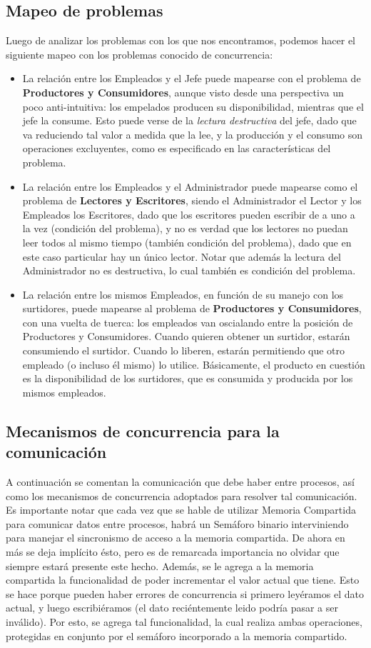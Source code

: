 \documentclass[a4paper,12pt]{article}
\begin{document}
\subsection{Mapeo de problemas}
Luego de analizar los problemas con los que nos encontramos, podemos hacer el siguiente mapeo con los problemas conocido de concurrencia:
\begin{itemize}
	\item La relación entre los Empleados y el Jefe puede mapearse con el problema de \textbf{Productores y Consumidores}, aunque visto desde una perspectiva un poco anti-intuitiva: los empelados producen su disponibilidad, mientras que el jefe la consume. Esto puede verse de la \textit{lectura destructiva} del jefe, dado que va reduciendo tal valor a medida que la lee, y la producción y el consumo son operaciones excluyentes, como es especificado en las características del problema.
	\item La relación entre los Empleados y el Administrador puede mapearse como el problema de \textbf{Lectores y Escritores}, siendo el Administrador el Lector y los Empleados los Escritores, dado que los escritores pueden escribir de a uno a la vez (condición del problema), y no es verdad que los lectores no puedan leer todos al mismo tiempo (también condición del problema), dado que en este caso particular hay un único lector. Notar que además la lectura del Administrador no es destructiva, lo cual también es condición del problema.
	\item La relación entre los mismos Empleados, en función de su manejo con los surtidores, puede mapearse al problema de \textbf{Productores y Consumidores}, con una vuelta de tuerca: los empleados van oscialando entre la posición de Productores y Consumidores. Cuando quieren obtener un surtidor, estarán consumiendo el surtidor. Cuando lo liberen, estarán permitiendo que otro empleado (o incluso él mismo) lo utilice. Básicamente, el producto en cuestión es la disponibilidad de los surtidores, que es consumida y producida por los mismos empleados.
\end{itemize}


\subsection{Mecanismos de concurrencia para la comunicación}
A continuación se comentan la comunicación que debe haber entre procesos, así como los mecanismos de concurrencia adoptados para resolver tal comunicación. Es importante notar que cada vez que se hable de utilizar Memoria Compartida para comunicar datos entre procesos, habrá un Semáforo binario interviniendo para manejar el sincronismo de acceso a la memoria compartida. De ahora en más se deja implícito ésto, pero es de remarcada importancia no olvidar que siempre estará presente este hecho. Además, se le agrega a la memoria compartida la funcionalidad de poder incrementar el valor actual que tiene. Esto se hace porque pueden haber errores de concurrencia si primero leyéramos el dato actual, y luego escribiéramos (el dato reciéntemente leido podría pasar a ser inválido). Por esto, se agrega tal funcionalidad, la cual realiza ambas operaciones, protegidas en conjunto por el semáforo incorporado a la memoria compartido. 
\end{document}
